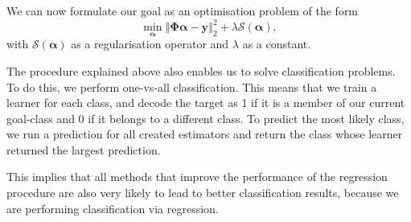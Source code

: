 We can now formulate our goal as an optimisation problem of the form
\begin{equation}\label{eq:optGoal}
\min_{\bm{\alpha}} \left\Vert  \bm{\Phi} \bm{\alpha} - \bm{y}   \right\Vert_2^2  + \lambda \mathcal{S}(\bm{\alpha}), 
\end{equation}
with \(\mathcal{S}(\bm{\alpha})\) as a regularisation operator and \(\lambda\) as a constant.

The procedure explained above also enables us to solve classification problems.
To do this, we perform one-vs-all classification.
This means that we train a learner for each class, and decode the target as 1 if it is a member of our current goal-class and 0 if it belongs to a different class.
To predict the most likely class, we run a prediction for all created estimators and return the class whose learner returned the largest prediction. 

This implies that all methods that improve the performance of the regression procedure are also very likely to lead to better classification results, because we are performing classification via regression.
